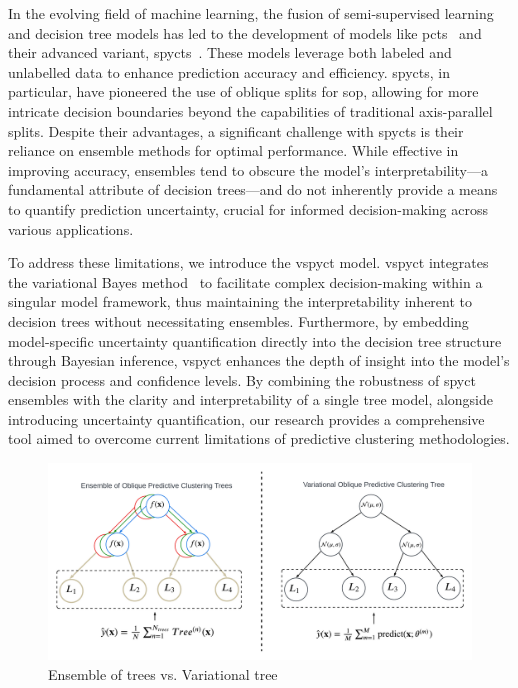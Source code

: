 \documentclass[3p,review,authoryear]{elsarticle}
\begin{document}
In the evolving field of machine learning, the fusion of semi-supervised learning and decision tree models has led to the development of models like \glspl{pct}~\citep{Kocev_2013} and their advanced variant, \glspl{spyct}~\citep{Stepi_nik_2021}.
These models leverage both labeled and unlabelled data to enhance prediction accuracy and efficiency.
\Glspl{spyct}, in particular, have pioneered the use of oblique splits for \gls{sop}, allowing for more intricate decision boundaries beyond the capabilities of traditional axis-parallel splits.
Despite their advantages, a significant challenge with \glspl{spyct} is their reliance on ensemble methods for optimal performance.
While effective in improving accuracy, ensembles tend to obscure the model's interpretability—a fundamental attribute of decision trees—and do not inherently provide a means to quantify prediction uncertainty, crucial for informed decision-making across various applications.

To address these limitations, we introduce the \gls{vspyct} model.
\gls{vspyct} integrates the variational Bayes method~\citep{Blei_2017} to facilitate complex decision-making within a singular model framework, thus maintaining the interpretability inherent to decision trees without necessitating ensembles.
Furthermore, by embedding model-specific uncertainty quantification directly into the decision tree structure through Bayesian inference, \gls{vspyct} enhances the depth of insight into the model's decision process and confidence levels.
By combining the robustness of \gls{spyct} ensembles with the clarity and interpretability of a single tree model, alongside introducing uncertainty quantification, our research provides a comprehensive tool aimed to overcome current limitations of predictive clustering methodologies.

\begin{figure}[h!]
    \centering
    \includegraphics[width=1.0\textwidth]{main_flowchart.pdf}
    \caption{Ensemble of trees vs. Variational tree}
    \label{fig:main_flowchart}
\end{figure}
\end{document}

